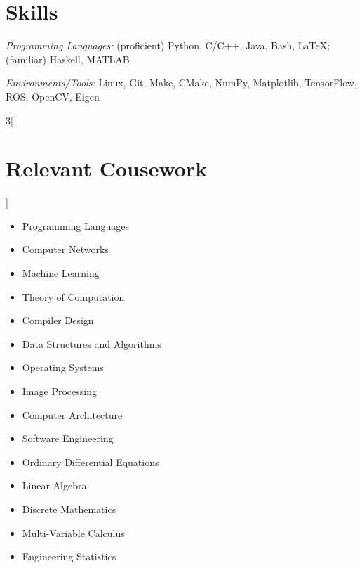 \documentclass[\ifdefined\cv11pt\else10pt\fi,letterpaper,roman]{moderncv}
\newcommand{\cvonly}[1]{\ifdefined\cv#1\fi}
\let\oldsection\section
\renewcommand{\section}[1]{\vspace*{-1.3ex}\oldsection{#1}\vspace*{-0.5ex}}
\begin{document}
\setlength{\premulticols}{0pt}
\section{Skills}
\textit{Programming Languages:} (proficient) Python, C/C++, Java, Bash, \LaTeX; (familiar) Haskell, MATLAB \par
\textit{Environments/Tools:} Linux, Git, Make, CMake, NumPy, Matplotlib, TensorFlow, ROS, OpenCV, Eigen \par
\begin{multicols}{3}[\section{Relevant Cousework}\vspace*{-1.2\topsep}]
\begin{itemize}
	\item Programming Languages
	\item Computer Networks
	\item Machine Learning
	\item Theory of Computation
	\item Compiler Design
	\item Data Structures and Algorithms
	\item Operating Systems
	\item Image Processing
	\item Computer Architecture
	\item Software Engineering
	\item Ordinary Differential Equations
	\item Linear Algebra
	\item Discrete Mathematics
	\cvonly{
		\item Multi-Variable Calculus
		\item Engineering Statistics
	}
\end{itemize}
\end{multicols}
\vspace{-2.8ex}
\end{document}
